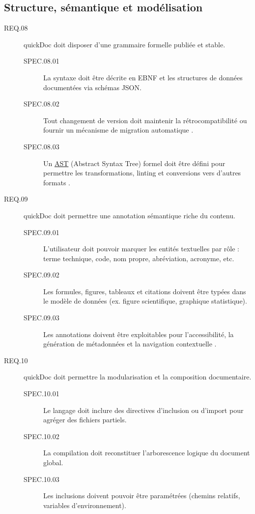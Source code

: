\documentclass[a4paper,12pt]{article}
\begin{document}
\subsection{Structure, sémantique et modélisation}
\label{sec:orgdc7229c}
\begin{description}
\item[{\label{org20ff8b0}REQ.08}] quickDoc doit disposer d’une grammaire formelle publiée et stable.
\begin{description}
\item[{\label{org597063b}SPEC.08.01}] La syntaxe doit être décrite en EBNF et les structures de données documentées via schémas JSON.
\item[{\label{orgf5fa78f}SPEC.08.02}] Tout changement de version doit maintenir la rétrocompatibilité ou fournir un mécanisme de migration automatique \autocite{junghansGrammarStandardizedWiki2008,dekkerSchemaLanguageParser2025}.
\item[{\label{org1177ae4}SPEC.08.03}] Un \protect\hyperlink{gls-3}{\label{gls-3-use-2}AST} (Abstract Syntax Tree) formel doit être défini pour permettre les transformations, linting et conversions vers d’autres formats \autocite{ducasseMicrodownCleanExtensible2020}.
\end{description}

\item[{\label{org03a6fad}REQ.09}] quickDoc doit permettre une annotation sémantique riche du contenu.
\begin{description}
\item[{\label{org57a7b22}SPEC.09.01}] L’utilisateur doit pouvoir marquer les entités textuelles par rôle : terme technique, code, nom propre, abréviation, acronyme, etc.
\item[{\label{orga91d48b}SPEC.09.02}] Les formules, figures, tableaux et citations doivent être typées dans le modèle de données (ex. figure scientifique, graphique statistique).
\item[{\label{orgc165789}SPEC.09.03}] Les annotations doivent être exploitables pour l’accessibilité, la génération de métadonnées et la navigation contextuelle \autocite{jasonc.whiteUsingMarkupLanguages2022,piotrowskiVisionUserdefinedSemantic2019}.
\end{description}

\item[{\label{org20b6b13}REQ.10}] quickDoc doit permettre la modularisation et la composition documentaire.
\begin{description}
\item[{\label{org83c524a}SPEC.10.01}] Le langage doit inclure des directives d’inclusion ou d’import pour agréger des fichiers partiels.
\item[{\label{orgedbaf39}SPEC.10.02}] La compilation doit reconstituer l’arborescence logique du document global.
\item[{\label{orgcbcc621}SPEC.10.03}] Les inclusions doivent pouvoir être paramétrées (chemins relatifs, variables d’environnement).
\end{description}


\end{description}
\end{document}
